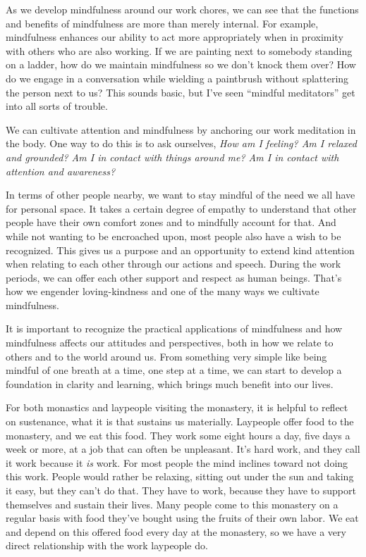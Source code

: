 As we develop mindfulness around our work chores, we can see that the 
functions and benefits of mindfulness are more than merely internal. 
For example, mindfulness enhances our ability to act more appropriately 
when in proximity with others who are also working. If we are painting 
next to somebody standing on a ladder, how do we maintain mindfulness 
so we don't knock them over? How do we engage in a conversation while 
wielding a paintbrush without splattering the person next to us? This 
sounds basic, but I've seen ``mindful meditators'' get into all sorts 
of trouble.

We can cultivate attention and mindfulness by anchoring our work 
meditation in the body. One way to do this is to ask ourselves, 
\emph{How am I feeling? Am I relaxed and grounded? Am I in contact with 
things around me? Am I in contact with attention and awareness?}

In terms of other people nearby, we want to stay mindful of the need we 
all have for personal space. It takes a certain degree of empathy to 
understand that other people have their own comfort zones and to 
mindfully account for that. And while not wanting to be encroached 
upon, most people also have a wish to be recognized. This gives us a 
purpose and an opportunity to extend kind attention when relating to 
each other through our actions and speech. During the work periods, we 
can offer each other support and respect as human beings. That's how we 
engender loving-kindness and one of the many ways we cultivate 
mindfulness.

It is important to recognize the practical applications of mindfulness 
and how mindfulness affects our attitudes and perspectives, both in how 
we relate to others and to the world around us. From something very 
simple like being mindful of one breath at a time, one step at a time, 
we can start to develop a foundation in clarity and learning, which 
brings much benefit into our lives.


For both monastics and laypeople visiting the monastery, it is helpful 
to reflect on sustenance, what it is that sustains us materially. 
Laypeople offer food to the monastery, and we eat this food. They work 
some eight hours a day, five days a week or more, at a job that can 
often be unpleasant. It's hard work, and they call it work because it 
\emph{is} work. For most people the mind inclines toward not doing this 
work. People would rather be relaxing, sitting out under the sun and 
taking it easy, but they can't do that. They have to work, because they 
have to support themselves and sustain their lives. Many people come to 
this monastery on a regular basis with food they've bought using the 
fruits of their own labor. We eat and depend on this offered food every 
day at the monastery, so we have a very direct relationship with the 
work laypeople do.

